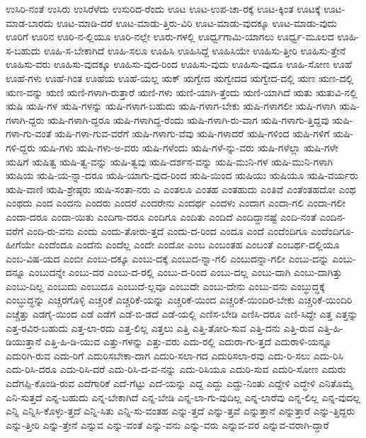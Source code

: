 {ಉಸಿರಿ-ನಂತೆ
ಉಸಿರು
ಉಸಿರೆಳೆದು
ಉಸುರಿದ-ರೆಂದು
ಊಟ
ಊಟ-ಉಪ-ಚಾ-ರಕ್ಕೆ
ಊಟ-ಕ್ಕಿಂತ
ಊಟಕ್ಕೆ
ಊಟ-ಮಾಡ-ಬಾರದು
ಊಟ-ಮಾಡಿ-ದರೆ
ಊಟ-ಮಾಡು-ತ್ತಿರು-ವಿರಿ
ಊಟ-ಮಾಡು-ವುದಕ್ಕೂ
ಊಟ-ಮಾಡು-ವುದು
ಊರಿಗೆ
ಊರಿನ
ಊರಿ-ನ-ಲ್ಲಿಯೂ
ಊರಿ-ನಲ್ಲೇ
ಊರು-ಗಳಲ್ಲಿ
ಊರ್ಧ್ವಗಾಮಿ-ಯಾಗಲು
ಊರ್ಧ್ವ-ಮೂಲದ
ಊಹಿ-ಸ-ಬಹುದು
ಊಹಿ-ಸ-ಬೇಕಾಗಿದೆ
ಊಹಿ-ಸಲೂ
ಊಹಿಸಿ
ಊಹಿಸಿದ್ದೆ
ಊಹಿಸಿಯೇ
ಊಹಿಸು-ತ್ತೀರಿ
ಊಹಿಸು-ತ್ತೇನೆ
ಊಹಿಸು-ವರು
ಊಹಿಸು-ವುದಕ್ಕೂ
ಊಹಿಸು-ವುದ-ರಿಂದ
ಊಹಿಸು-ವುದು
ಊಹಿಸು-ವುದೂ
ಊಹಿ-ಸೋಣ
ಊಹೆ
ಊಹೆ-ಗಳು
ಊಹೆ-ಗಿಂತ
ಊಹೆಯ
ಊಹೆ-ಯಲ್ಲ
ಋಕ್
ಋಗ್ವೇದ
ಋಗ್ವೇದದ
ಋಗ್ವೇದ-ದಲ್ಲಿ
ಋಣ
ಋಣ-ದಲ್ಲಿ
ಋಣ-ವನ್ನು
ಋಣಿ
ಋಣಿ-ಗಳಾಗಿ-ರುತ್ತಾರೆ
ಋಣಿ-ಗಳು
ಋಣಿ-ಯಾಗಿ-ತ್ತೆಂದು
ಋಣಿ-ಯಾಗಿದೆ
ಋತು
ಋತುವಿ-ನಲ್ಲಿ
ಋಷಿ
ಋಷಿ-ಗಳ
ಋಷಿ-ಗಳನ್ನು
ಋಷಿ-ಗಳಾಗ-ಬಹುದು
ಋಷಿ-ಗಳಾಗ-ಬೇಕು
ಋಷಿ-ಗಳಾಗಲೀ
ಋಷಿ-ಗಳಾಗಿ
ಋಷಿ-ಗಳಾಗಿ-ದ್ದರು
ಋಷಿ-ಗಳಾಗಿ-ದ್ದರೂ
ಋಷಿ-ಗಳಾಗಿದ್ದ-ರೆಂದು
ಋಷಿ-ಗಳಾಗಿ-ರು-ವಾಗ
ಋಷಿ-ಗಳಾಗು-ತ್ತಿದ್ದವು
ಋಷಿ-ಗಳಾ-ಗು-ವಂತೆ
ಋಷಿ-ಗಳಾ-ಗುವ-ವರೆಗೆ
ಋಷಿ-ಗಳಾಗು-ವೆವು
ಋಷಿ-ಗಳಾದರೆ
ಋಷಿ-ಗಳಿಂದ
ಋಷಿ-ಗಳಿಗೆ
ಋಷಿ-ಗಳಿ-ದ್ದರು
ಋಷಿ-ಗಳು
ಋಷಿ-ಗಳು-ಅ-ವರು
ಋಷಿ-ಗಳೆಂದು
ಋಷಿ-ಗಳೆ-ನ್ನು-ವರು
ಋಷಿ-ಗಳೆಲ್ಲಾ
ಋಷಿ-ಗಳೇ
ಋಷಿಗೆ
ಋಷಿತ್ವ
ಋಷಿ-ತ್ವ-ವನ್ನು
ಋಷಿ-ತ್ವವು
ಋಷಿ-ದರ್ಶನ-ವನ್ನು
ಋಷಿ-ಮುನಿ-ಗಳ
ಋಷಿ-ಮುನಿ-ಗಳಾಗಿ
ಋಷಿಯ
ಋಷಿ-ಯ-ನ್ನಾ-ದರೂ
ಋಷಿ-ಯಾಗು-ವುದ-ರಿಂದ
ಋಷಿ-ಯಿಂದ
ಋಷಿಯು
ಋಷಿಯೂ
ಋಷಿ-ವರ್ಯರು
ಋಷಿ-ವಾಣಿ
ಋಷಿ-ಶ್ರೇಷ್ಠರು
ಋಷಿ-ಸಂತಾ-ನರು
ಎ
ಎಂತಲೂ
ಎಂತಹ
ಎಂತಹುದು
ಎಂತಿವೆ
ಎಂತೆಂತಹದೋ
ಎಂಥ
ಎಂಥದು
ಎಂದ
ಎಂದನು
ಎಂದರು
ಎಂದರೆ
ಎಂದರೇನು
ಎಂದರ್ಥ
ಎಂದಳು
ಎಂದಾಗ
ಎಂದಾ-ಗಲಿ
ಎಂದಾ-ಗಲೀ
ಎಂದಾ-ದರೂ
ಎಂದಾ-ಯಿತು
ಎಂದಿಗಾ-ದರೂ
ಎಂದಿಗೂ
ಎಂದಿತು
ಎಂದಿದೆ
ಎಂದಿದ್ದಾನಷ್ಟೆ
ಎಂದಿ-ನಂತೆ
ಎಂದಿನ-ವರೆಗೆ
ಎಂದಿ-ರು-ವನು
ಎಂದು
ಎಂದು-ತೋರು-ತ್ತದೆ
ಎಂದು-ದ-ರಿಂದ
ಎಂದೂ
ಎಂದೆ
ಎಂದೆಂದಿಗೂ
ಎಂದೆಂದಿಗೂ-ಹೀಗೆಯೇ
ಎಂದೆಂದೂ
ಎಂದೆನು
ಎಂದೆಲ್ಲ
ಎಂದೇ
ಎಂದೋ
ಎಂಬ
ಎಂಬಂತಹ
ಎಂಬಂತೆ
ಎಂಬರ್ಥ-ದಲ್ಲಿಯೂ
ಎಂಬ-ವಿಷ-ಯದ
ಎಂಬೀ
ಎಂಬು-ದಕ್ಕೂ
ಎಂಬು-ದಕ್ಕೆ
ಎಂಬುದ-ನ್ನಾ-ಗಲಿ
ಎಂಬುದನ್ನಾ-ಗಲೀ
ಎಂಬು-ದನ್ನು
ಎಂಬು-ದನ್ನೂ
ಎಂಬುದನ್ನೇ
ಎಂಬು-ದರ
ಎಂಬು-ದ-ರಲ್ಲಿ
ಎಂಬು-ದ-ರಿಂದ
ಎಂಬು-ದಲ್ಲ
ಎಂಬು-ದಾಗಿ
ಎಂಬು-ದಾಗಿತ್ತು
ಎಂಬು-ದಿಲ್ಲ
ಎಂಬುದು
ಎಂಬುದೂ
ಎಂಬುದೆ-ಲ್ಲವೂ
ಎಂಬುದೇ
ಎಂಬು-ದೇನು
ಎಂಬು-ವನು
ಎಂಬ್ಧುದ್ಧಕ್ಕೆ
ಎಂಬ್ಧುದ್ಧನ್ನು
ಎಚ್ಚರಗೊಳ್ಳಿ
ಎಚ್ಚರಿಕೆ
ಎಚ್ಚರಿಕೆ-ಯನ್ನು
ಎಚ್ಚರಿಕೆ-ಯಿಂದ
ಎಚ್ಚರಿಕೆ-ಯಿಂದಿರ-ಬೇಕು
ಎಚ್ಚರಿಕೆ-ಯಿಂದಿರಿ
ಎಚ್ಚೆತ್ತು
ಎಡಗೈ-ಯಿಂದ
ಎಡೆ
ಎಡೆಗೆ
ಎಡೆ-ಬಿ-ಡದೆ
ಎಡೆ-ಯಲ್ಲಿ
ಎಣಿಸ-ಬೇಡಿ
ಎಣಿಸಿ-ದರೂ
ಎಣಿ-ಸಿದ್ದೇ
ಎತ್ತ
ಎತ್ತನ್ನು
ಎತ್ತ-ರವಿರ-ಬಹುದು
ಎತ್ತ-ಲಾ-ರದು
ಎತ್ತ-ಲಿಲ್ಲ
ಎತ್ತಲು
ಎತ್ತಿ
ಎತ್ತಿ-ತೋರಿ-ಸುವ
ಎತ್ತಿ-ದನು
ಎತ್ತಿ-ರುವ
ಎತ್ತಿ-ಹಿ-ಡಿಯುತ್ತಾನೆ
ಎತ್ತಿ-ಹಿ-ಡಿ-ಯುವ
ಎತ್ತು-ಗಳನ್ನು
ಎತ್ತು-ವರು
ಎದು-ರಲ್ಲಿ
ಎದುರಾ-ಗು-ತ್ತದೆ
ಎದುರಾಳಿ-ಯನ್ನೂ
ಎದುರಿಗಿ-ರುವ
ಎದು-ರಿಗೆ
ಎದುರಿಸಬೇಕಾ-ದಾಗ
ಎದುರಿ-ಸಲಾ-ಗದ
ಎದುರಿಸಲಾ-ರವು
ಎದು-ರಿ-ಸಲು
ಎದು-ರಿಸಿ
ಎದು-ರಿಸಿ-ದರೂ
ಎದು-ರಿಸಿ-ದರೆ
ಎದು-ರಿಸಿ-ದ-ವ-ನನ್ನು
ಎದು-ರಿಸಿಯೂ
ಎದುರಿ-ಸುವ
ಎದುರಿ-ಸೋಣ
ಎದುರು
ಎದೆಗಪ್ಪಿ-ಕೊಂಡಿ-ರುವ
ಎದೆಗಾರಿಕೆ
ಎದೆ-ಗೆಟ್ಟು
ಎದೆ-ಯನ್ನು
ಎದ್ದ
ಎದ್ದು
ಎದ್ದು-ನಿಂತು
ಎದ್ದೇಳಿ
ಎದ್ಧೇಳಿ
ಎನಿತೊಮ್ಮೆ
ಎನಿ-ಸುತ್ತದೆ
ಎನ್ನ-ಬಹುದು
ಎನ್ನ-ಬೇಕಾಗಿದೆ
ಎನ್ನ-ಬೇಡಿ
ಎನ್ನ-ಲಾ-ಗು-ವುದಿಲ್ಲ
ಎನ್ನ-ಲಾರೆವು
ಎನ್ನ-ಲಿಲ್ಲ
ಎನ್ನ-ವುದಲ್ಲ
ಎನ್ನಿ
ಎನ್ನಿಸಿ-ಕೊಳ್ಳು-ತ್ತದೆ
ಎನ್ನಿ-ಸಿತು
ಎನ್ನಿ-ಸು-ವಂತಹ
ಎನ್ನು-ತ್ತದೆ
ಎನ್ನು-ತ್ತವೆ
ಎನ್ನುತ್ತಾನೆ
ಎನ್ನುತ್ತಾರೆ
ಎನ್ನು-ತ್ತಿದ್ದರು
ಎನ್ನು-ತ್ತೀರಿ
ಎನ್ನು-ತ್ತೇನೆ
ಎನ್ನುವ
ಎನ್ನು-ವಂತೆ
ಎನ್ನು-ವನು
ಎನ್ನು-ವರು
ಎನ್ನುವ-ವರ
ಎನ್ನುವ-ವರಾಗಿ-ದ್ದಾರೆ
}
